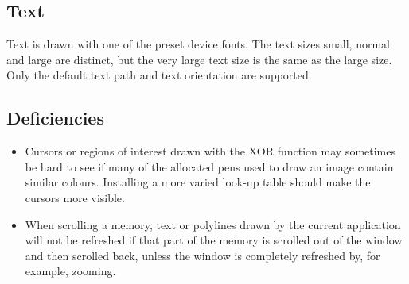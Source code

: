 \subsection{Text}

Text is drawn with one of the preset device fonts. The text sizes small,
normal and large are distinct, but the very large text size is the same
as the large size. Only the default text path and text orientation are
supported.

\subsection{Deficiencies}

\begin{itemize}
\item
Cursors or regions of interest drawn with the XOR function may sometimes
be hard to see if many of the allocated pens used to draw an image contain
similar colours. Installing a more varied look-up table should make the
cursors more visible.

\item
When scrolling a memory, text or polylines drawn by the current application
will not be refreshed if that part of the memory is scrolled out of the
window and then scrolled back, unless the window is completely refreshed by,
for example, zooming.
\end{itemize}



